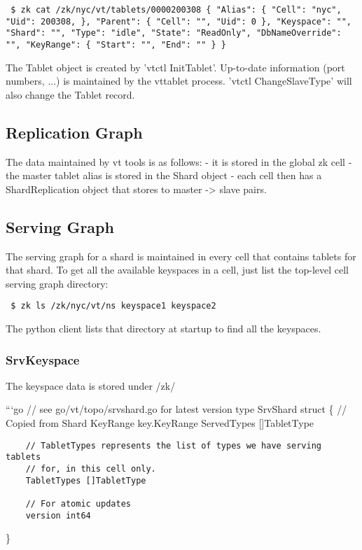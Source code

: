 {\tt 
\$ zk cat /zk/nyc/vt/tablets/0000200308
\{
  "Alias": \{
    "Cell": "nyc",
    "Uid": 200308,
  \},
  "Parent": \{
    "Cell": "",
    "Uid": 0
  \},
  "Keyspace": "",
  "Shard": "",
  "Type": "idle",
  "State": "ReadOnly",
  "DbNameOverride": "",
  "KeyRange": \{
    "Start": "",
    "End": ""
  \}
\}
}

The Tablet object is created by 'vtctl InitTablet'. Up-to-date information (port numbers, ...) is maintained by the vttablet process. 'vtctl ChangeSlaveType' will also change the Tablet record.

\subsection{Replication Graph}\hypertarget{replication-graph}{}\label{replication-graph}

The data maintained by vt tools is as follows:
- it is stored in the global zk cell
- the master tablet alias is stored in the Shard object
- each cell then has a ShardReplication object that stores to master -\textgreater{} slave pairs.

\subsection{Serving Graph}\hypertarget{serving-graph}{}\label{serving-graph}

The serving graph for a shard is maintained in every cell that contains tablets for that shard. To get all the available keyspaces in a cell, just list the top-level cell serving graph directory:

{\tt 
\$ zk ls /zk/nyc/vt/ns
keyspace1
keyspace2
}

The python client lists that directory at startup to find all the keyspaces.

\subsubsection{SrvKeyspace}\hypertarget{srvkeyspace}{}\label{srvkeyspace}

The keyspace data is stored under /zk/

```go
// see go/vt/topo/srvshard.go for latest version
type SrvShard struct \{
        // Copied from Shard
        KeyRange    key.KeyRange
        ServedTypes []TabletType

\begin{verbatim}    // TabletTypes represents the list of types we have serving tablets
    // for, in this cell only.
    TabletTypes []TabletType

    // For atomic updates
    version int64
\end{verbatim}
\}

